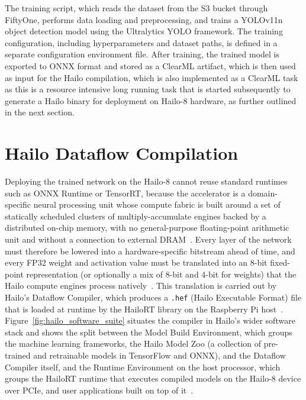 \documentclass[12pt,oneside,bibtotoc,liststotoc]{scrbook}
\begin{document}
The training script, which reads the dataset from the S3 bucket through FiftyOne, performs data
loading and preprocessing, and trains a YOLOv11n object detection model using the Ultralytics YOLO
framework. The training configuration, including hyperparameters and dataset paths, is defined in a
separate configuration environment file. After training, the trained model is exported to ONNX format
and stored as a ClearML artifact, which is then used as input for the Hailo compilation, which is also
implemented as a ClearML task as this is a resource intensive long running task that is started
subsequently to generate a Hailo binary for deployment on
Hailo-8 hardware, as further outlined in the next section.

\vspace{-2em}
\section{Hailo Dataflow Compilation}
\vspace{-0.5em}

Deploying the trained network on the Hailo-8 cannot reuse standard
runtimes such as ONNX Runtime or TensorRT, because the accelerator is a
domain-specific neural processing unit whose compute fabric is built
around a set of statically scheduled clusters of multiply-accumulate
engines backed by a distributed on-chip memory, with no
general-purpose floating-point arithmetic unit and without a
connection to external DRAM~\cite{hailo8_m2datasheet2021,hailo8_productBrief2023}.
Every layer of the network must therefore be lowered into a
hardware-specific bitstream ahead of time, and every FP32 weight and
activation value must be translated into an 8-bit fixed-point
representation (or optionally a mix of 8-bit and 4-bit for weights)
that the Hailo compute engines process
natively~\cite{krishnamoorthi2018quantizingWhitepaper,hailo8_productBrief2023}.
This translation is carried out by Hailo's Dataflow Compiler, which
produces a \texttt{.hef} (Hailo Executable Format) file that is loaded
at runtime by the HailoRT library on the Raspberry Pi
host~\cite{hailoDataflowCompilerUserGuide}. Figure~\ref{fig:hailo_software_suite}
situates the compiler in Hailo's wider software stack and shows the
split between the Model Build Environment, which groups the machine
learning frameworks, the Hailo Model Zoo (a collection of pre-trained
and retrainable models in TensorFlow and ONNX), and the Dataflow
Compiler itself, and the Runtime Environment on the host processor,
which groups the HailoRT runtime that executes compiled models on the
Hailo-8 device over PCIe, and user applications built on top of
it~\cite{hailo8_productBrief2023}.
\end{document}
